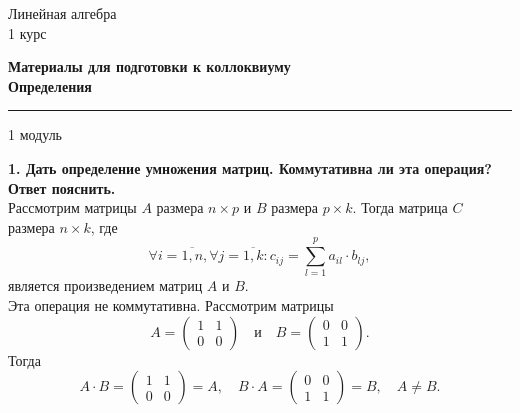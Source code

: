 \documentclass[11pt,a4paper]{article}
\author{Дедов Иван}
\begin{document}
\begin{center}

\begin{huge}
\textsf{Линейная алгебра\\1 курс}
\end{huge}

\vspace{5mm}

\begin{LARGE}
\textsf{\textbf{Материалы для подготовки к коллоквиуму\\ \vspace{3mm}
Определения}}
\end{LARGE}

\end{center}

\rule{\linewidth}{0.3mm}

\vspace{1mm}
\begin{center}
\begin{LARGE}
\textsf{1 модуль}
\end{LARGE}
\end{center}
\vspace{1mm}

\textbf{1. Дать определение умножения матриц. Коммутативна ли эта операция? Ответ пояснить.\\}
Рассмотрим матрицы $A$ размера $n \times p$ и $B$ размера $p \times k$. Тогда матрица $C$ размера $n \times k$, где $$\forall i = \overline{1, n}, \forall j = \overline{1, k}: c_{ij} = \sum_{l=1}^{p} a_{il} \cdot b_{lj},$$ является произведением матриц $A$ и $B$.\\
Эта операция не коммутативна. Рассмотрим матрицы
$$ A =
\left( \begin{matrix}
1 & 1 \\
0 & 0
\end{matrix} \right)
\quad \text{и} \quad
B =
\left( \begin{matrix}
0 & 0 \\
1 & 1
\end{matrix} \right).$$
Тогда
$$ A \cdot B =
\left( \begin{matrix}
1 & 1 \\
0 & 0
\end{matrix} \right) = A,
\quad
B \cdot A =
\left( \begin{matrix}
0 & 0 \\
1 & 1
\end{matrix} \right) = B,
\quad
A \neq B.$$
\end{document}

